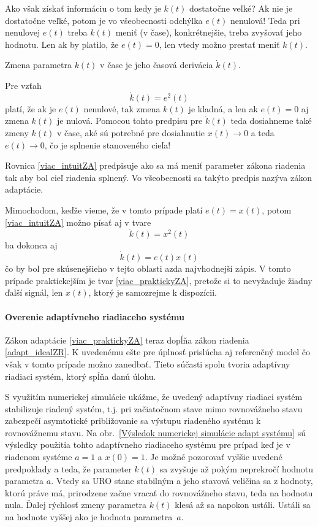 \documentclass[a4paper, 10pt, ]{article}
\begin{document}
Ako však získať informáciu o tom kedy je $k(t)$ dostatočne veľké? Ak nie je dostatočne veľké, potom je vo všeobecnosti odchýlka $e(t)$ nenulová! Teda pri nenulovej $e(t)$ treba $k(t)$ meniť (v čase), konkrétnejšie, treba zvyšovať jeho hodnotu. Len ak by platilo, že $e(t) = 0$, len vtedy možno prestať meniť $k(t)$.

Zmena parametra $k(t)$ v čase je jeho časová derivácia $\dot k(t)$.

Pre vzťah
\begin{equation} \label{viac_intuitZA}
	\dot k(t) = e^2(t)
\end{equation}
platí, že ak je $e(t)$ nenulové, tak zmena $k(t)$ je kladná, a len ak $e(t) = 0$ aj zmena $k(t)$ je nulová. Pomocou tohto predpisu pre $\dot k(t)$ teda dosiahneme také zmeny $k(t)$ v čase, aké sú potrebné pre dosiahnutie $x(t) \to 0$ a teda $e(t) \to 0$, čo je splnenie stanoveného cieľa!

Rovnica \eqref{viac_intuitZA} predpisuje ako sa má meniť parameter zákona riadenia tak aby bol cieľ riadenia splnený. Vo všeobecnosti sa takýto predpis nazýva zákon adaptácie.

Mimochodom, keďže vieme, že v tomto prípade platí $e(t) = x(t)$, potom \eqref{viac_intuitZA} možno písať aj v tvare
\begin{equation} \label{viac_praktickyZA}
	\dot k(t) = x^2(t)
\end{equation}
ba dokonca aj
\begin{equation}
	\dot k(t) = e(t)x(t)
\end{equation}
čo by bol pre skúsenejšieho v tejto oblasti azda najvhodnejší zápis. V tomto prípade praktickejším je tvar \eqref{viac_praktickyZA}, pretože si to nevyžaduje žiadny ďalší signál, len $x(t)$, ktorý je samozrejme k dispozícii.


\paragraph{Overenie adaptívneho riadiaceho systému}

Zákon adaptácie \eqref{viac_praktickyZA} teraz dopĺňa zákon riadenia \eqref{adapt_idealZR}. K uvedenému ešte pre úplnosť prislúcha aj referenčný model čo však v tomto prípade možno zanedbať. Tieto súčasti spolu tvoria adaptívny riadiaci systém, ktorý spĺňa danú úlohu.

S využitím numerickej simulácie ukážme, že uvedený adaptívny riadiaci systém stabilizuje riadený systém, t.j. pri začiatočnom stave mimo rovnovážneho stavu zabezpečí asymtotické približovanie sa výstupu riadeného systému k rovnovážnemu stavu. Na obr.~\ref{Výsledok numerickej simulácie adapt systému} sú výsledky použitia tohto adaptívneho riadiaceho systému pre prípad keď je v riadenom systéme $a = 1$ a $x(0) = 1$. Je možné pozorovať vyššie uvedené predpoklady a teda, že parameter $k(t)$ sa zvyšuje až pokým neprekročí hodnotu parametra $a$. Vtedy sa URO stane stabilným a jeho stavová veličina sa z hodnoty, ktorú práve má, prirodzene začne vracať do rovnovážneho stavu, teda na hodnotu nula. Ďalej rýchlosť zmeny parametra $k(t)$ klesá až sa napokon ustáli. Ustáli sa na hodnote vyššej ako je hodnota parametra~$a$.
\end{document}
